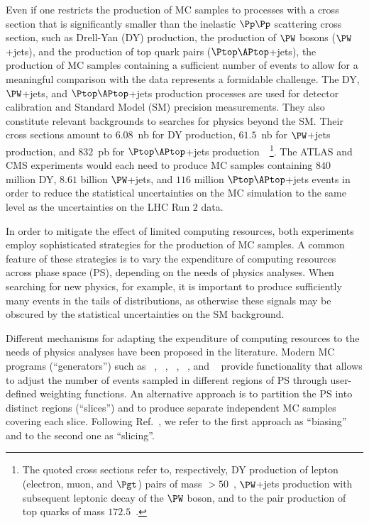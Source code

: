 Even if one restricts the production of MC samples to processes with a cross section that is significantly smaller than the inelastic $\Pp\Pp$ scattering cross section,
such as Drell-Yan (DY) production, the production of $\PW$ bosons ($\PW$+jets), and the production of top quark pairs ($\Ptop\APtop$+jets),
the production of MC samples containing a sufficient number of events to allow for a meaningful comparison with the data represents a formidable challenge.
The DY, $\PW$+jets, and $\Ptop\APtop$+jets production processes are used for detector calibration and Standard Model (SM) precision measurements.
They also constitute relevant backgrounds to searches for physics beyond the SM.
Their cross sections amount to $6.08$~nb for DY production, $61.5$~nb for $\PW$+jets production,
and $832$~pb for $\Ptop\APtop$+jets production~\cite{Melnikov:2006kv,Li:2012wna,Czakon:2011xx}~\footnote{
  The quoted cross sections refer to, respectively, DY production of lepton (electron, muon, and $\Pgt$) pairs of mass $> 50$~\GeV,
  $\PW$+jets production with subsequent leptonic decay of the $\PW$ boson,
  and to the pair production of top quarks of mass $172.5$~\GeV.
}.
The ATLAS and CMS experiments would each need to produce MC samples containing $840$ million DY, $8.61$ billion $\PW$+jets, and $116$ million $\Ptop\APtop$+jets events
in order to reduce the statistical uncertainties on the MC simulation to the same level as the uncertainties on the LHC Run $2$ data.

In order to mitigate the effect of limited computing resources, both experiments employ sophisticated strategies for the production of MC samples.
A common feature of these strategies is to vary the expenditure of computing resources across phase space (PS),
depending on the needs of physics analyses.
When searching for new physics, for example, it is important to produce sufficiently many events in the tails of distributions,
as otherwise these signals may be obscured by the statistical uncertainties on the SM background.

Different mechanisms for adapting the expenditure of computing resources to the needs of physics analyses have been proposed in the literature.
Modern MC programs (``generators'') such as \POWHEG~\cite{POWHEG1,POWHEG2,POWHEG3}, \MGvATNLO~\cite{MGvATNLO}, \SHERPA~\cite{SHERPA}, \PYTHIA~\cite{PYTHIA}, and \HERWIG~\cite{HERWIG}
provide functionality that allows to adjust the number of events sampled in different regions of PS through user-defined weighting functions.
An alternative approach is to partition the PS into distinct regions (``slices'') and to produce separate independent MC samples covering each slice.
Following Ref.~\cite{HSFPhysicsEventGeneratorWG:2020gxw}, we refer to the first approach as ``biasing'' and to the second one as ``slicing''.

